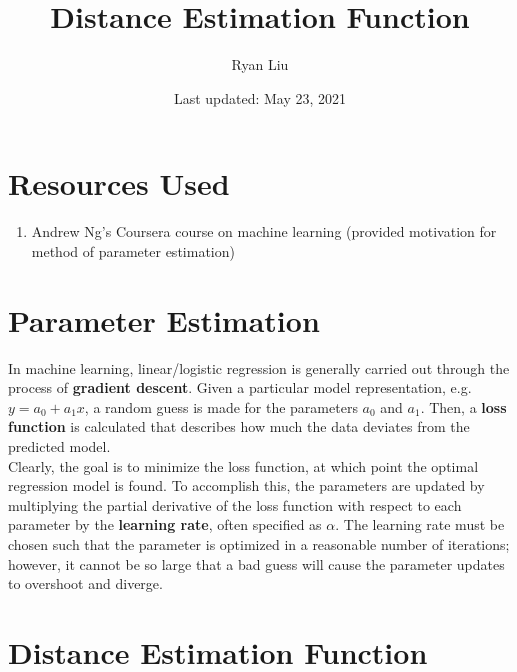 \documentclass{article}
\title{Distance Estimation Function}
\author{Ryan Liu}
\date{Last updated: May 23, 2021}
\begin{document}
\maketitle

\section{Resources Used}

\begin{enumerate}
    \item Andrew Ng's Coursera course on machine learning (provided motivation for method of parameter estimation)
\end{enumerate}

\section{Parameter Estimation}

In machine learning, linear/logistic regression is generally carried out through the process of \textbf{gradient descent}. Given a particular model representation, e.g. $y = a_0 + a_1x$, a random guess is made for the parameters $a_0$ and $a_1$. Then, a \textbf{loss function} is calculated that describes how much the data deviates from the predicted model. \\

Clearly, the goal is to minimize the loss function, at which point the optimal regression model is found. To accomplish this, the parameters are updated by multiplying the partial derivative of the loss function with respect to each parameter by the \textbf{learning rate}, often specified as $\alpha$. The learning rate must be chosen such that the parameter is optimized in a reasonable number of iterations; however, it cannot be so large that a bad guess will cause the parameter updates to overshoot and diverge. 

\section{Distance Estimation Function}
\end{document}
